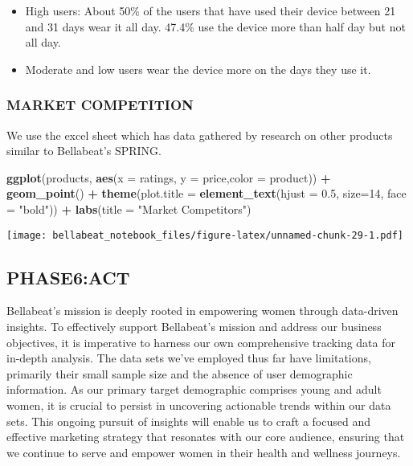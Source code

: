 \documentclass[
]{article}
\newenvironment{Shaded}{\begin{snugshade}}{\end{snugshade}}
\newcommand{\AttributeTok}[1]{\textcolor[rgb]{0.13,0.29,0.53}{#1}}
\newcommand{\DecValTok}[1]{\textcolor[rgb]{0.00,0.00,0.81}{#1}}
\newcommand{\FloatTok}[1]{\textcolor[rgb]{0.00,0.00,0.81}{#1}}
\newcommand{\FunctionTok}[1]{\textcolor[rgb]{0.13,0.29,0.53}{\textbf{#1}}}
\newcommand{\NormalTok}[1]{#1}
\newcommand{\SpecialCharTok}[1]{\textcolor[rgb]{0.81,0.36,0.00}{\textbf{#1}}}
\newcommand{\StringTok}[1]{\textcolor[rgb]{0.31,0.60,0.02}{#1}}
\providecommand{\tightlist}{%
  \setlength{\itemsep}{0pt}\setlength{\parskip}{0pt}}
\begin{document}
\begin{itemize}
\tightlist
\item
  High users: About 50\% of the users that have used their device
  between 21 and 31 days wear it all day. 47.4\% use the device more
  than half day but not all day.
\item
  Moderate and low users wear the device more on the days they use it.
\end{itemize}

\hypertarget{market-competition}{%
\subsubsection{MARKET COMPETITION}\label{market-competition}}

We use the excel sheet which has data gathered by research on other
products similar to Bellabeat's SPRING.

\begin{Shaded}
\begin{Highlighting}[]
\FunctionTok{ggplot}\NormalTok{(products, }\FunctionTok{aes}\NormalTok{(}\AttributeTok{x =}\NormalTok{ ratings, }\AttributeTok{y =}\NormalTok{ price,}\AttributeTok{color =}\NormalTok{ product)) }\SpecialCharTok{+}
  \FunctionTok{geom\_point}\NormalTok{() }\SpecialCharTok{+}
  \FunctionTok{theme}\NormalTok{(}\AttributeTok{plot.title =} \FunctionTok{element\_text}\NormalTok{(}\AttributeTok{hjust =} \FloatTok{0.5}\NormalTok{, }\AttributeTok{size=}\DecValTok{14}\NormalTok{, }\AttributeTok{face =} \StringTok{"bold"}\NormalTok{)) }\SpecialCharTok{+}
  \FunctionTok{labs}\NormalTok{(}\AttributeTok{title =} \StringTok{"Market Competitors"}\NormalTok{)}
\end{Highlighting}
\end{Shaded}

\texttt{[image: bellabeat\_notebook\_files/figure-latex/unnamed-chunk-29-1.pdf]}

\hypertarget{phase6act}{%
\subsection{PHASE6:ACT}\label{phase6act}}

Bellabeat's mission is deeply rooted in empowering women through
data-driven insights. To effectively support Bellabeat's mission and
address our business objectives, it is imperative to harness our own
comprehensive tracking data for in-depth analysis. The data sets we've
employed thus far have limitations, primarily their small sample size
and the absence of user demographic information. As our primary target
demographic comprises young and adult women, it is crucial to persist in
uncovering actionable trends within our data sets. This ongoing pursuit
of insights will enable us to craft a focused and effective marketing
strategy that resonates with our core audience, ensuring that we
continue to serve and empower women in their health and wellness
journeys.
\end{document}
